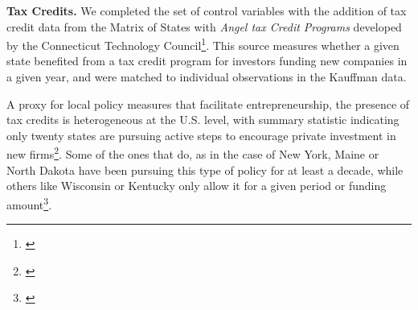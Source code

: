 \textbf{Tax Credits.} We completed the set of control variables with the addition of tax credit data from the Matrix of States with \textit{Angel tax Credit Programs} developed by the Connecticut Technology Council\footnote{\cite{Nwosu2010}}. This source measures whether a given state benefited from a tax credit program for investors funding new companies in a given year, and were matched to individual observations in the Kauffman data.

A proxy for local policy measures that facilitate entrepreneurship, the presence of tax credits is heterogeneous at the U.S. level, with summary statistic indicating only twenty states are pursuing active steps to encourage private investment in new firms\footnote{\cite{Nwosu2010}}. Some of the ones that do, as in the case of New York, Maine or North Dakota have been pursuing this type of policy for at least a decade, while others like Wisconsin or Kentucky only allow it for a given period or funding amount\footnote{\cite{Nwosu2010}}. 


